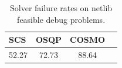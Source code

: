 \begin{table}
\centering
\caption{Solver failure rates on netlib feasible debug problems.}
\label{t-netlib feasible debug-failure}
\begin{tabular}{lccc}
\toprule
  SCS &  OSQP &  COSMO \\
\midrule
52.27 & 72.73 &  88.64 \\
\bottomrule
\end{tabular}
\end{table}
